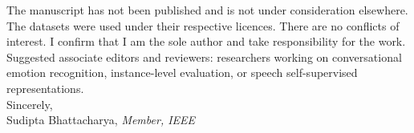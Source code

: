 \documentclass[11pt]{article}
\begin{document}
The manuscript has not been published and is not under consideration elsewhere. The datasets were used under their respective licences. There are no conflicts of interest. I confirm that I am the sole author and take responsibility for the work.\\[1.2em]

\noindent Suggested associate editors and reviewers: researchers working on conversational emotion recognition, instance-level evaluation, or speech self-supervised representations.\\[1.5em]

\noindent Sincerely,\\[2em]
\noindent Sudipta Bhattacharya, \emph{Member, IEEE}
\end{document}
